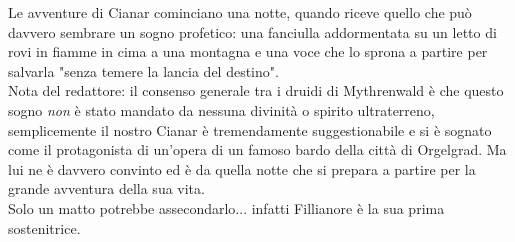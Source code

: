 Le avventure di Cianar cominciano una notte, quando riceve quello che può davvero sembrare un sogno profetico: una fanciulla addormentata su un letto di rovi in fiamme in cima a una montagna e una voce che lo sprona a partire per salvarla "senza temere la lancia del destino".\\
Nota del redattore: il consenso generale tra i druidi di Mythrenwald è che questo sogno \textit{non} è stato mandato da nessuna divinità o spirito ultraterreno, semplicemente il nostro Cianar è tremendamente suggestionabile e si è sognato come il protagonista di un'opera di un famoso bardo della città di Orgelgrad. Ma lui ne è davvero convinto ed è da quella notte che si prepara a partire per la grande avventura della sua vita.\\
Solo un matto potrebbe assecondarlo... infatti Fillianore è la sua prima sostenitrice.
